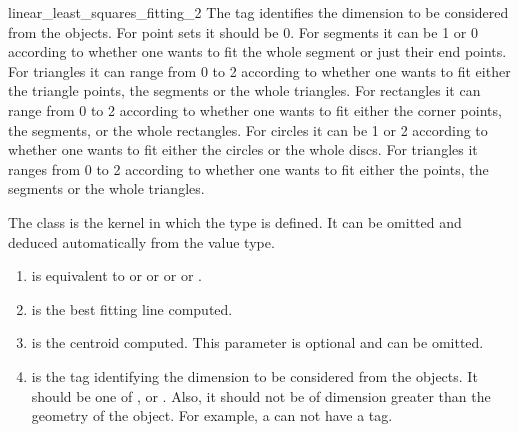 \begin{ccRefFunction}{linear_least_squares_fitting_2}
The tag  identifies the dimension to be considered from the objects. For point sets it should be 0. For segments it can be 1 or 0 according to whether one wants to fit the whole segment or just their end points. For triangles it can range from 0 to 2 according to whether one wants to fit either the triangle points, the segments or the whole triangles. For rectangles it can range from 0 to 2 according to whether one wants to fit either the corner points, the segments, or the whole rectangles. For circles it can be 1 or 2 according to whether one wants to fit either the circles or the whole discs. For triangles it ranges from 0 to 2 according to whether one wants to fit either the points, the segments or the whole triangles.

The class  is the kernel in which the type  is defined. It can be omitted and deduced automatically from the value type.\\


\begin{enumerate}
   \item  {} is equivalent to  or 
           or  or  or
          .
   \item  {} is the best fitting line computed.
   \item  {} is the centroid computed. This parameter is optional and can be
          omitted.
   \item  {} is the tag identifying the dimension to be considered from the objects. It should be one of ,  or . Also, it should not be of dimension greater than the geometry of the object. For example, a  can not have a  tag.
\end{enumerate}

\end{ccRefFunction}
